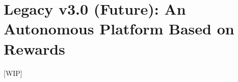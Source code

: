 
\section{Legacy v3.0 (Future): An Autonomous Platform Based on Rewards} %
\label{sec:lgacy_v3_0_}

[WIP]


 




